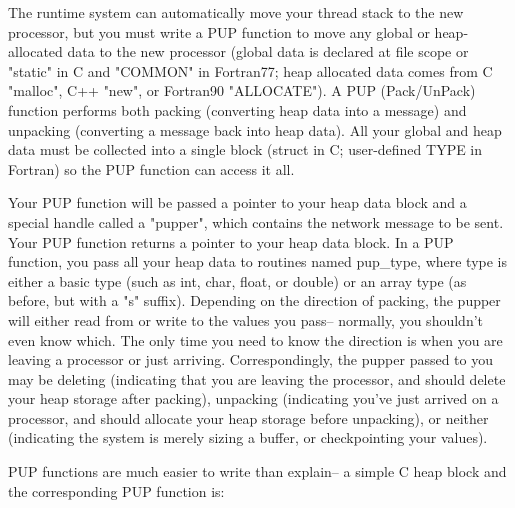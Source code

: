 \documentclass[11pt]{article}
\begin{document}
The runtime system can automatically move your thread stack to the new
processor, but you must write a PUP function to move any global or
heap-allocated data to the new processor (global data is declared at file
scope or "static" in C and "COMMON" in Fortran77; heap allocated data comes
from C "malloc", C++ "new", or Fortran90 "ALLOCATE").  A PUP (Pack/UnPack)
function performs both packing (converting heap data into a message) and
unpacking (converting a message back into heap data).  All your global and
heap data must be collected into a single block (struct in C; user-defined
TYPE in Fortran) so the PUP function can access it all.

Your PUP function will be passed a pointer to your heap data block and a
special handle called a "pupper", which contains the network message to be
sent.  Your PUP function returns a pointer to your heap data block.  In a
PUP function, you pass all your heap data to routines named pup\_type, where
type is either a basic type (such as int, char, float, or double) or an
array type (as before, but with a "s" suffix).  Depending on the direction
of packing, the pupper will either read from or write to the values you
pass-- normally, you shouldn't even know which.  The only time you need to
know the direction is when you are leaving a processor or just arriving.
Correspondingly, the pupper passed to you may be deleting (indicating that
you are leaving the processor, and should delete your heap storage after
packing), unpacking (indicating you've just arrived on a processor, and
should allocate your heap storage before unpacking), or neither (indicating
the system is merely sizing a buffer, or checkpointing your values).

PUP functions are much easier to write than explain-- a simple C heap block
and the corresponding PUP function is:
\end{document}
